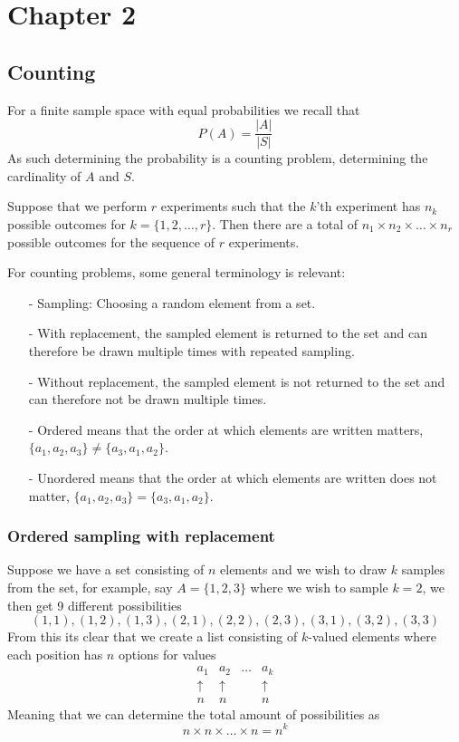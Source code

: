 \section{Chapter 2}
\subsection{Counting}
For a finite sample space with equal probabilities we recall that
\[
    P(A)=\frac{|A|}{|S|}
\]
As such determining the probability is a counting problem, determining the cardinality of $A$ and $S$.
\begin{definition}
    Suppose that we perform $r$ experiments such that the $k$'th experiment has $n_{k}$ possible outcomes for $k=\{1,2,\ldots,r\}$. Then there are a total of $n_{1}\times n_{2}\times\ldots\times n_{r}$ possible outcomes for the sequence of $r$ experiments.
\end{definition}
For counting problems, some general terminology is relevant:
\begin{itemize}
    \item[-] Sampling: Choosing a random element from a set.
    \item[-] With replacement, the sampled element is returned to the set and can therefore be drawn multiple times with repeated sampling.
    \item[-] Without replacement, the sampled element is not returned to the set and can therefore not be drawn multiple times.
    \item[-] Ordered means that the order at which elements are written matters, $\{a_{1},a_{2},a_{3}\}\neq \{a_{3},a_{1},a_{2}\}$.
    \item[-] Unordered means that the order at which elements are written does not matter, $\{a_{1},a_{2},a_{3}\}=\{a_{3},a_{1},a_{2}\}$.
\end{itemize}
\subsubsection{Ordered sampling with replacement}
Suppose we have a set consisting of $n$ elements and we wish to draw $k$ samples from the set, for example, say $A=\{1,2,3\}$ where we wish to sample $k=2$, we then get 9 different possibilities
\[
    (1,1),(1,2),(1,3),(2,1),(2,2),(2,3),(3,1),(3,2),(3,3)
\]
From this its clear that we create a list consisting of $k$-valued elements where each position has $n$ options for values
\[\begin{array}{cccc}
    a_1 & a_2 & \ldots & a_k \\
    \uparrow & \uparrow & & \uparrow \\
    n & n & & n
 \end{array}\]
Meaning that we can determine the total amount of possibilities as 
\[
    n\times n\times\ldots\times n=n^{k}
\]
